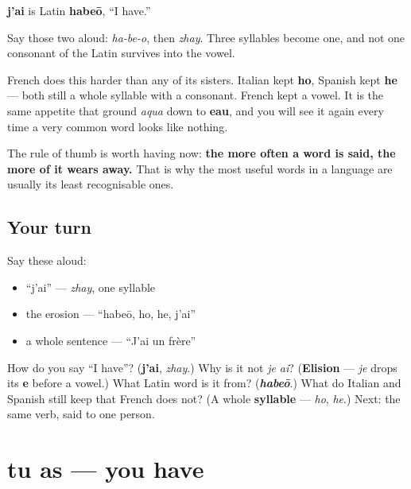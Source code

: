 \begin{cousinweb}
\textbf{j'ai} is Latin \textbf{habeō}, \textquotedblleft{}I have.\textquotedblright{}

Say those two aloud: \emph{ha-be-o}, then \emph{zhay}. Three syllables become one, and not one consonant of the Latin survives into the vowel.

French does this harder than any of its sisters. Italian kept \textbf{ho}, Spanish kept \textbf{he} — both still a whole syllable with a consonant. French kept a vowel. It is the same appetite that ground \emph{aqua} down to \textbf{eau}, and you will see it again every time a very common word looks like nothing.

The rule of thumb is worth having now: \textbf{the more often a word is said, the more of it wears away.} That is why the most useful words in a language are usually its least recognisable ones.
\end{cousinweb}

\subsection*{Your turn}
Say these aloud:

\begin{itemize}
\raggedright
  \item \textquotedblleft{}j'ai\textquotedblright{} — \emph{zhay}, one syllable
  \item the erosion — \textquotedblleft{}habeō, ho, he, j'ai\textquotedblright{}
  \item a whole sentence — \textquotedblleft{}J'ai un frère\textquotedblright{}
\end{itemize}

\begin{tcolorbox}[breakable,colback=teal!4,colframe=teal!35!black,title={Before you move on}]
How do you say \textquotedblleft{}I have\textquotedblright{}? (\textbf{j'ai}, \emph{zhay}.) Why is it not \emph{je ai}? (\textbf{Elision} — \emph{je} drops its \textbf{e} before a vowel.) What Latin word is it from? (\emph{\textbf{habeō}}.) What do Italian and Spanish still keep that French does not? (A whole \textbf{syllable} — \emph{ho}, \emph{he}.) Next: the same verb, said to one person.
\end{tcolorbox}
\section[tu as]{tu as — you have}

